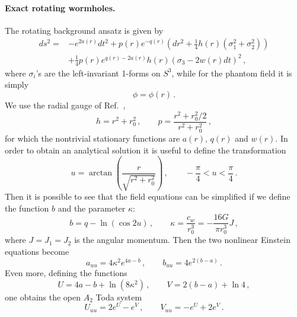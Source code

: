 \documentclass[aps,prl,reprint,superscriptaddress,nofootinbib,floatfix]{revtex4-2}
\newcommand{\cw}{c_{w}}
\newcommand{\rr}{r_0}
\newcommand{\kap}{\kappa}
\begin{document}
\paragraph{Exact rotating wormholes.}


The rotating background ansatz is given by
\begin{eqnarray}
    ds^2 =
    & -e^{2a({r})} dt^2 +
    p({r}) e^{-q({r})} \left(d{r}^2+ \frac{1}{4} h({r}) (\sigma_1^2 + \sigma_2^2) \right) 
    \nonumber \\ &
    + \frac{1}{4} p({r}) e^{q({r})-2a({r})} h({r}) \left(\sigma_3 -2 w({r}) dt \right)^2 \,,
\end{eqnarray}
where $\sigma_i$'s are the left-invariant 1-forms on $S^3$,
while for the phantom field it is simply
\begin{equation}
    \phi = \phi({r}) \,.
\end{equation}
We use the radial gauge of Ref.~\cite{Dzhunushaliev:2013jja},
\begin{equation}
 h={r}^2+\rr^2 \,,\qquad
 p=\frac{{r}^2+\rr^2/2}{{r}^2+\rr^2} \,,
\end{equation}
for which the nontrivial stationary functions are $a({r})$, $q({r})$ and $w({r})$.  
In order to obtain an analytical solution it is useful to define the transformation
\begin{equation}
 u=\arctan\!\left(\frac{{r}}{\sqrt{{r}^2+\rr^2}}\right) \,,
 \qquad -\frac{\pi}{4}<u<\frac{\pi}{4} \,.
 \label{eq:u}
\end{equation}
Then it is possible to see that the field equations can be simplified if we define the function $b$ and the parameter $\kappa$:
\begin{equation}
 b=q-\ln(\cos2u) \,,\qquad \kap=\frac{\cw}{\rr^3} = -\frac{16 G}{\pi r_0^3}J \,,
\end{equation}
where $J=J_1=J_2$ is the angular momentum.
Then the two nonlinear Einstein equations 
become
\begin{equation}
 a_{uu}=4\kap^2 e^{4a-b} \,,\qquad
 b_{uu}=4e^{2(b-a)} \,.
\end{equation}
Even more, defining the functions
\begin{equation}
 U=4a-b+\ln(8\kap^2)\,,\qquad V=2(b-a)+\ln4 \,,
\end{equation}
one obtains the open $A_2$ Toda system
\begin{equation}
 U_{uu}=2e^U-e^V \,,\qquad V_{uu}=-e^U+2e^V \,.
 \label{eq:toda}
\end{equation}
\end{document}
